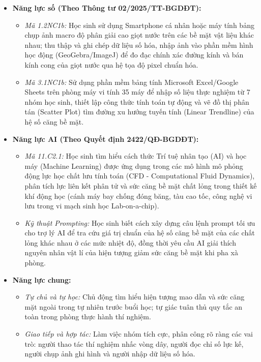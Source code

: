 \documentclass[12pt, a4paper]{article}
\begin{document}
\begin{itemize}[leftmargin=1.2cm]
    \item \textbf{Năng lực số (Theo Thông tư 02/2025/TT-BGDĐT):}
    \begin{itemize}[leftmargin=0.6cm]
        \item \textit{Mã 1.2NC1b:} Học sinh sử dụng Smartphone cá nhân hoặc máy tính bảng chụp ảnh macro độ phân giải cao giọt nước trên các bề mặt vật liệu khác nhau; thu thập và ghi chép dữ liệu số hóa, nhập ảnh vào phần mềm hình học động (GeoGebra/ImageJ) để đo đạc chính xác đường kính và bán kính cong của giọt nước qua hệ tọa độ pixel chuẩn hóa.
        \item \textit{Mã 3.1NC1b:} Sử dụng phần mềm bảng tính Microsoft Excel/Google Sheets trên phòng máy vi tính 35 máy để nhập số liệu thực nghiệm từ 7 nhóm học sinh, thiết lập công thức tính toán tự động và vẽ đồ thị phân tán (Scatter Plot) tìm đường xu hướng tuyến tính (Linear Trendline) của hệ số căng bề mặt.
    \end{itemize}

    \item \textbf{Năng lực AI (Theo Quyết định 2422/QĐ-BGDĐT):}
    \begin{itemize}[leftmargin=0.6cm]
        \item \textit{Mã 11.C2.1:} Học sinh tìm hiểu cách thức Trí tuệ nhân tạo (AI) và học máy (Machine Learning) được ứng dụng trong các mô hình mô phỏng động lực học chất lưu tính toán (CFD - Computational Fluid Dynamics), phân tích lực liên kết phân tử và sức căng bề mặt chất lỏng trong thiết kế khí động học (cánh máy bay chống đóng băng, tàu cao tốc, công nghệ vi lưu trong vi mạch sinh học Lab-on-a-chip).
        \item \textit{Kỹ thuật Prompting:} Học sinh biết cách xây dựng câu lệnh prompt tối ưu cho trợ lý AI để tra cứu giá trị chuẩn của hệ số căng bề mặt của các chất lỏng khác nhau ở các mức nhiệt độ, đồng thời yêu cầu AI giải thích nguyên nhân vật lí của hiện tượng giảm sức căng bề mặt khi pha xà phòng.
    \end{itemize}

    \item \textbf{Năng lực chung:}
    \begin{itemize}[leftmargin=0.6cm]
        \item \textit{Tự chủ và tự học:} Chủ động tìm hiểu hiện tượng mao dẫn và sức căng mặt ngoài trong tự nhiên trước buổi học; tự giác tuân thủ quy tắc an toàn trong phòng thực hành thí nghiệm.
        \item \textit{Giao tiếp và hợp tác:} Làm việc nhóm tích cực, phân công rõ ràng các vai trò: người thao tác thí nghiệm nhấc vòng dây, người đọc chỉ số lực kế, người chụp ảnh ghi hình và người nhập dữ liệu số hóa.
    \end{itemize}
\end{itemize}
\end{document}
